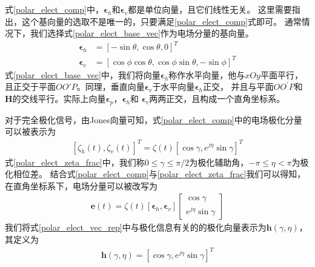 \documentclass[master]{thesis-uestc}
\begin{document}
式\eqref{polar_elect_comp}中，$\bm{\epsilon}_h$和$\bm{\epsilon}_v$都是单位向量，且它们线性无关。
这里需要指出，这个基向量的选取不是唯一的，只要满足\eqref{polar_elect_comp}式即可。
通常情况下，我们选择式\eqref{polar_elect_base_vec}作为电场分量的基向量。
\begin{subequations}\label{polar_elect_base_vec}
    \begin{align}
        \bm{\epsilon}_{h} &=[-\sin \theta, \cos \theta, 0]^{T} \\
        \bm{\epsilon}_{v} &=[\cos \phi \cos \theta, \cos \phi \sin \theta,-\sin \phi]^{T}
    \end{align}
\end{subequations}
式\eqref{polar_elect_base_vec}中，我们将向量$\bm{\epsilon}_h$称作水平向量，他与$xOy$平面平行，
且正交于平面$OO\prime P$。同理，垂直向量$\bm{\epsilon}_v$于水平向量$\bm{\epsilon}_h$正交，
并且与平面$OO^\prime P$和$\bm{H}$的交线平行。实际上向量$\bm{\epsilon}_p$，$\bm{\epsilon}_h$和
$\bm{\epsilon}_v$两两正交，且构成一个直角坐标系。

对于完全极化信号，由Jones向量可知，式\eqref{polar_elect_comp}中的电场极化分量可以被表示为
\begin{equation}\label{polar_elect_zeta_frac}
    \begin{aligned}
        \left[\zeta_{h}(t), \zeta_{v}(t)\right]^{T}=\zeta(t)\left[\cos \gamma, e^{j \eta} \sin \gamma\right]^{T}
    \end{aligned}
\end{equation}
式\eqref{polar_elect_zeta_frac}中，我们称$0\le\gamma\le\pi/2$为极化辅助角，$-\pi\le\eta<\pi$为极化相位差。
结合式\eqref{polar_elect_comp}与\eqref{polar_elect_zeta_frac}我们可以得知，在直角坐标系下，电场分量可以被改写为
\begin{equation}\label{polar_elect_vec_rep}
    \begin{aligned}
        \boldsymbol{e}(t)=\zeta(t)\left[\boldsymbol{\epsilon}_{h}, \boldsymbol{\epsilon}_{v}\right]
        \left[\begin{array}{c}
            \cos \gamma \\
            e^{j \eta} \sin \gamma
            \end{array}
        \right]
    \end{aligned}
\end{equation}
我们将式\eqref{polar_elect_vec_rep}中与极化信息有关的的极化向量表示为$\bm{h}(\gamma,\eta)$，其定义为
\begin{equation}\label{polar_vec}
    \begin{aligned}
        \bm{h}(\gamma, \eta)=\left[\cos \gamma, e^{j \eta} \sin \gamma\right]^{T}
    \end{aligned}
\end{equation}
\end{document}
